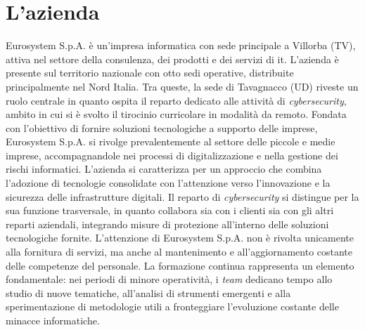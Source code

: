 \section{L'azienda}
Eurosystem S.p.A. è un'impresa informatica con sede principale a Villorba (TV), attiva nel settore della consulenza, dei prodotti e dei servizi di \gls{it}. L'azienda è presente sul territorio nazionale con otto sedi operative, distribuite principalmente nel Nord Italia. Tra queste, la sede di Tavagnacco (UD) riveste un ruolo centrale in quanto ospita il reparto dedicato alle attività di \textit{cybersecurity}, ambito in cui si è svolto il tirocinio curricolare in modalità da remoto.  
Fondata con l'obiettivo di fornire soluzioni tecnologiche a supporto delle imprese, Eurosystem S.p.A. si rivolge prevalentemente al settore delle piccole e medie imprese, accompagnandole nei processi di digitalizzazione e nella gestione dei rischi informatici. L'azienda si caratterizza per un approccio che combina l'adozione di tecnologie consolidate con l'attenzione verso l'innovazione e la sicurezza delle infrastrutture digitali.  
Il reparto di \textit{cybersecurity} si distingue per la sua funzione trasversale, in quanto collabora sia con i clienti sia con gli altri reparti aziendali, integrando misure di protezione all'interno delle soluzioni tecnologiche fornite.  
L'attenzione di Eurosystem S.p.A. non è rivolta unicamente alla fornitura di servizi, ma anche al mantenimento e all'aggiornamento costante delle competenze del personale. La formazione continua rappresenta un elemento fondamentale: nei periodi di minore operatività, i \textit{team} dedicano tempo allo studio di nuove tematiche, all'analisi di strumenti emergenti e alla sperimentazione di metodologie utili a fronteggiare l'evoluzione costante delle minacce informatiche.  